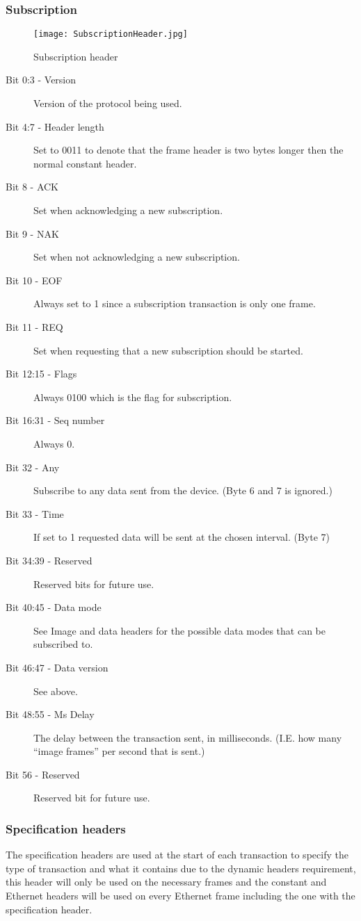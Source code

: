 \subsubsection*{Subscription}
\begin{figure}
\centering
\texttt{[image: SubscriptionHeader.jpg]}
\caption{Subscription header}
\label{fig:SubscriptionHeader}
\end{figure}
\begin{description}
\item [Bit 0:3 - Version] Version of the protocol being used.
\item [Bit 4:7 - Header length] Set to 0011 to denote that the frame header is two bytes longer then the normal constant header.
\item [Bit 8 - ACK] Set when acknowledging a new subscription.
\item [Bit 9 - NAK] Set when not acknowledging a new subscription.
\item [Bit 10 - EOF] Always set to 1 since a subscription transaction is only one frame.
\item [Bit 11 - REQ] Set when requesting that a new subscription should be started.
\item [Bit 12:15 - Flags] Always 0100 which is the flag for subscription.
\item [Bit 16:31 - Seq number] Always 0.
\item [Bit 32 - Any] Subscribe to any data sent from the device. (Byte 6 and 7 is ignored.)
\item [Bit 33 - Time] If set to 1 requested data will be sent at the chosen interval. (Byte 7)
\item [Bit 34:39 - Reserved] Reserved bits for future use.
\item [Bit 40:45 - Data mode] See Image and data headers for the possible data modes that can be subscribed to.
\item [Bit 46:47 - Data version] See above.
\item [Bit 48:55 - Ms Delay] The delay between the transaction sent, in milliseconds. (I.E. how many “image frames” per second that is sent.)
\item [Bit 56 - Reserved] Reserved bit for future use.
\end{description}

\subsubsection{Specification headers}
The specification headers are used at the start of each transaction to specify the type of transaction and what it contains due to the dynamic headers requirement, this header will only be used on the necessary frames and the constant and Ethernet headers will be used on every Ethernet frame including the one with the specification header.
